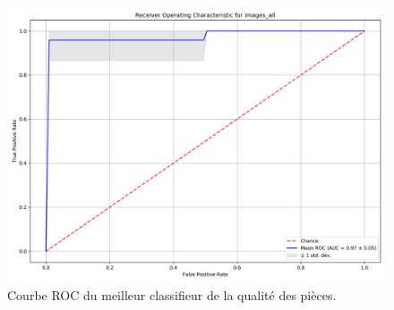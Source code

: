 \begin{figure}[hbtp]
    \centering
    \includegraphics[width=\textwidth,height=\textheight,keepaspectratio]{../Chap3/Figures/roc_images_all_224_3cams_densenet_conv4_PCA20.png}
    \caption{Courbe ROC du meilleur classifieur de la qualité des pièces.}
    \label{fig:roc}
\end{figure}



